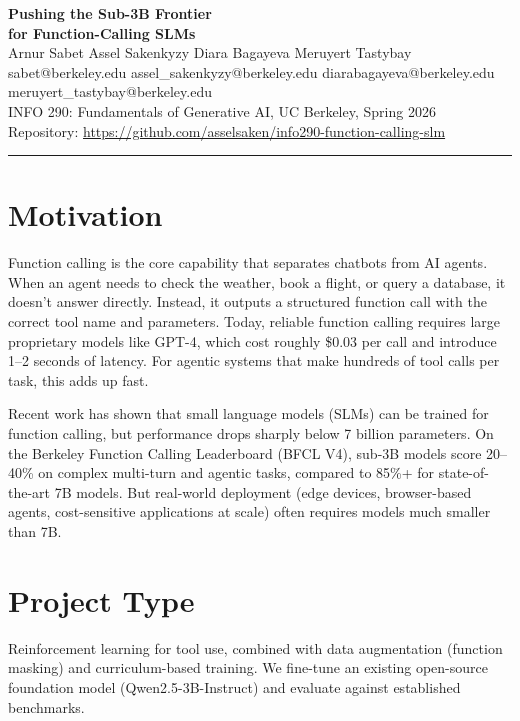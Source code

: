 \documentclass[11pt, letterpaper]{article}
\begin{document}
\begin{center}
  {\LARGE\bfseries Pushing the Sub-3B Frontier\\[4pt] for Function-Calling SLMs}\\[18pt]
  {\large Arnur Sabet \quad Assel Sakenkyzy \quad Diara Bagayeva \quad Meruyert Tastybay}\\[4pt]
  {\small\color{dimgray} sabet@berkeley.edu \quad assel\_sakenkyzy@berkeley.edu \quad diarabagayeva@berkeley.edu \quad meruyert\_tastybay@berkeley.edu}\\[6pt]
  {\color{dimgray} INFO 290: Fundamentals of Generative AI, UC Berkeley, Spring 2026}\\[6pt]
  {\color{dimgray}\small Repository: \url{https://github.com/asselsaken/info290-function-calling-slm}}
\end{center}

\vspace{6pt}
\hrule
\vspace{10pt}

\section*{Motivation}

Function calling is the core capability that separates chatbots from AI agents. When an agent needs to check the weather, book a flight, or query a database, it doesn't answer directly. Instead, it outputs a structured function call with the correct tool name and parameters. Today, reliable function calling requires large proprietary models like GPT-4, which cost roughly \$0.03 per call and introduce 1--2 seconds of latency. For agentic systems that make hundreds of tool calls per task, this adds up fast.

Recent work has shown that small language models (SLMs) can be trained for function calling, but performance drops sharply below 7 billion parameters. On the Berkeley Function Calling Leaderboard (BFCL V4), sub-3B models score 20--40\% on complex multi-turn and agentic tasks, compared to 85\%+ for state-of-the-art 7B models. But real-world deployment (edge devices, browser-based agents, cost-sensitive applications at scale) often requires models much smaller than 7B.

\section*{Project Type}

Reinforcement learning for tool use, combined with data augmentation (function masking) and curriculum-based training. We fine-tune an existing open-source foundation model (Qwen2.5-3B-Instruct) and evaluate against established benchmarks.
\end{document}
